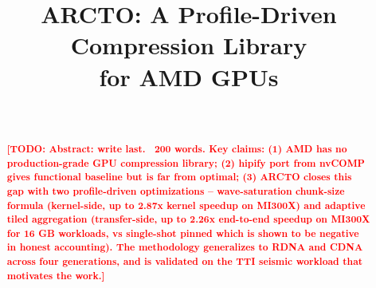 \documentclass[conference]{IEEEtran}
\title{ARCTO: A Profile-Driven Compression Library\\
       for AMD GPUs}
\author{
  \IEEEauthorblockN{Anonymous Author(s)}\\
  \IEEEauthorblockA{Affiliation omitted for double-blind review}
}
\newcommand{\TODO}[1]{\textcolor{red}{\textbf{[TODO: #1]}}}
\begin{document}
\maketitle

\begin{abstract}
\TODO{Abstract: write last. ~200 words. Key claims:
(1) AMD has no production-grade GPU compression library;
(2) hipify port from nvCOMP gives functional baseline but is far from
optimal; (3) ARCTO closes this gap with two profile-driven
optimizations -- wave-saturation chunk-size formula
(kernel-side, up to 2.87x kernel speedup on MI300X) and adaptive
tiled aggregation (transfer-side, up to 2.26x end-to-end speedup on
MI300X for 16 GB workloads, vs single-shot pinned which is shown to
be negative in honest accounting). The methodology generalizes to
RDNA and CDNA across four generations, and is validated on the TTI
seismic workload that motivates the work.}
\end{abstract}







% 
% 



\end{document}

